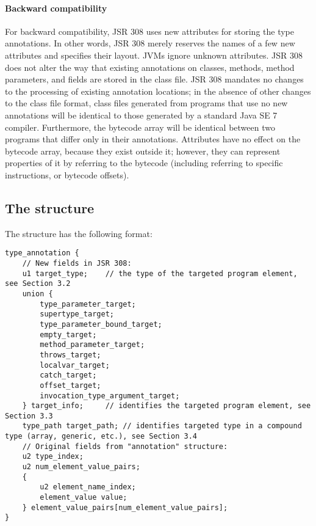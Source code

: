 \documentclass[10pt]{article}
\begin{document}
\paragraph{Backward compatibility}
For backward compatibility, JSR 308 uses new attributes for storing
the type annotations.  In other words, JSR 308 merely reserves the
names of a few new attributes and specifies their layout.
JVMs ignore unknown
attributes.
JSR 308 does
not alter the way that existing annotations on classes, methods, method parameters,
and fields are stored in the class file.
JSR 308 mandates no changes to the processing of existing annotation locations;
in the absence of other changes to the class file format,
class files generated from programs that use no new
annotations will be identical to those generated by a standard Java SE 7
compiler.
Furthermore, the bytecode array will be identical between two programs that
differ only in their annotations.
Attributes have no effect on the bytecode array, because they exist outside
it; however, they can represent properties of it by referring to the
bytecode (including referring to specific instructions, or bytecode offsets).


\subsection{The  structure\label{class-file:ext}}

The \extendedannotation structure has the following format:

\preverbnegspace
\begin{Verbatim}
type_annotation {
    // New fields in JSR 308:
    u1 target_type;    // the type of the targeted program element, see Section 3.2
    union {
        type_parameter_target;
        supertype_target;
        type_parameter_bound_target;
        empty_target;
        method_parameter_target;
        throws_target;
        localvar_target;
        catch_target;
        offset_target;
        invocation_type_argument_target;
    } target_info;     // identifies the targeted program element, see Section 3.3
    type_path target_path; // identifies targeted type in a compound type (array, generic, etc.), see Section 3.4
    // Original fields from "annotation" structure:
    u2 type_index;
    u2 num_element_value_pairs;
    {
        u2 element_name_index;
        element_value value;
    } element_value_pairs[num_element_value_pairs];
}
\end{Verbatim}
\end{document}
